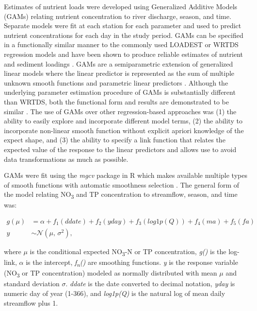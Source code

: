 \documentclass[water,article,submit,oneauthor]{Definitions/mdpi}
\begin{document}
Estimates of nutrient loads were developed using Generalized Additive
Models (GAMs) relating nutrient concentration to river discharge,
season, and time. Separate models were fit at each station for each
parameter and used to predict nutrient concentrations for each day in
the study period. GAMs can be specified in a functionally similar manner
to the commonly used LOADEST \citep{cohn_validity_1992} or WRTDS
\citep{hirsch_weighted_2010} regression models and have been shown to
produce reliable estimates of nutrient and sediment loadings
\citep{wangLoadEstimationUncertainties2011, kroonRiverLoadsSuspended2012, kuhnert_quantifying_2012, robson_prediction_2015-1, hagemannEstimatingNutrientOrganic2016, mcdowell_implications_2021, biagi_novel_2022}.
GAMs are a semiparametric extension of generalized linear models where
the linear predictor is represented as the sum of multiple unknown
smooth functions and parametric linear predictors
\citep{wood_fast_2011}. Although the underlying parameter estimation
procedure of GAMs is substantially different than WRTDS, both the
functional form and results are demonstrated to be similar
\citep{beckNumericalQualitativeContrasts2017}. The use of GAMs over
other regression-based approaches was (1) the ability to easily explore
and incorporate different model terms, (2) the ability to incorporate
non-linear smooth function without explicit apriori knowledge of the
expect shape, and (3) the ability to specify a link function that
relates the expected value of the response to the linear predictors and
allows use to avoid data transformations as much as possible.

GAMs were fit using the \emph{mgcv} package in R which makes available
multiple types of smooth functions with automatic smoothness selection
\citep{wood_fast_2011}. The general form of the model relating
NO\textsubscript{3} and TP concentration to streamflow, season, and time
was:

\begin{equation}\label{eq:1}
\begin{aligned}
g(\mu) &= \alpha + f_1(ddate) + f_2(yday) + f_3(log1p(Q)) + f_4(ma) + f_5(fa)  \\
y &\sim \mathcal{N}(\mu,\,\sigma^{2}),
\end{aligned}
\end{equation}

where \(\mu\) is the conditional expected NO\textsubscript{3}-N or TP
concentration, \emph{g()} is the log-link, \(\alpha\) is the intercept,
\emph{f\textsubscript{n}()} are smoothing functions. \emph{y} is the
response variable (NO\textsubscript{3} or TP concentration) modeled as
normally distributed with mean \(\mu\) and standard deviation
\(\sigma\). \emph{ddate} is the date converted to decimal notation,
\emph{yday} is numeric day of year (1-366), and \emph{log1p(Q)} is the
natural log of mean daily streamflow plus 1.
\end{document}
